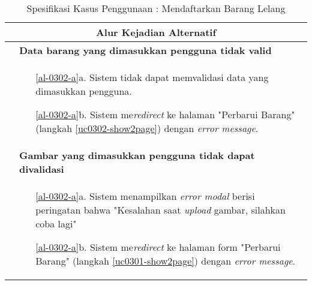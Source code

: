 \begin{table}[H]
\begin{tabular}{|r|p{8cm}|}
		\multicolumn{2}{|c|}{\textbf{Alur Kejadian Alternatif}}                                                         \\ \hline
		\multicolumn{1}{|l|}{}                                           & \textbf{Data barang yang dimasukkan pengguna tidak valid}
			\\ \hline
		\multicolumn{1}{|l|}{}                                           & 
			 \begin{itemize}
			 	\item[\ref{al-0302-a}a.] Sistem tidak dapat memvalidasi data yang dimasukkan pengguna.
			 	\item[\ref{al-0302-a}b.] Sistem me\textit{redirect} ke halaman "Perbarui Barang" (langkah \ref{uc0302-show2page}) dengan \textit{error message}.
			 \end{itemize}
		 \\ \hline
		 \multicolumn{1}{|l|}{}                                           & \textbf{Gambar yang dimasukkan pengguna tidak dapat divalidasi}
		 \\ \hline
		 \multicolumn{1}{|l|}{}                                           & 
		 \begin{itemize}
		 	\item[\ref{al-0302-a}a.] Sistem menampilkan \textit{error modal} berisi peringatan bahwa "Kesalahan saat \textit{upload} gambar, silahkan coba lagi"
		 	\item[\ref{al-0302-a}b.] Sistem me\textit{redirect} ke halaman form "Perbarui Barang" (langkah \ref{uc0301-show2page}) dengan \textit{error message}.
		 \end{itemize}
		 \\ \hline
	\end{tabular}
	\caption{Spesifikasi Kasus Penggunaan : Mendaftarkan Barang Lelang}
	\label{uc03.02}
\end{table}